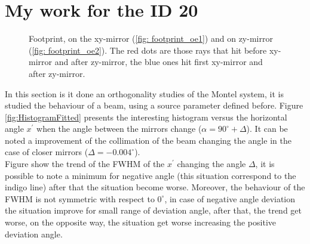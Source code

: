 \section{My work for the ID 20}

\begin{figure}[]
%
\centering
%
%
\quad
%
\caption{Footprint, on the xy-mirror (\ref{fig: footprint_oe1}) and on zy-mirror (\ref{fig: footprint_oe2}). The red dots are those rays that hit before xy-mirror and after zy-mirror, the blue ones hit first xy-mirror and after zy-mirror.}
%
\label{fig: footprint}
%
\end{figure}
In this section is it done an orthogonality studies of the Montel system, it is studied the behaviour of a beam, using a source parameter defined before. Figure \ref{fig:HistogramFitted} presents the interesting histogram versus the horizontal angle $x^{'} $ when the angle between the mirrors change ($\alpha = 90^{\circ} + \Delta $). It can be noted a improvement of the collimation of the beam changing the angle in the case of closer mirrors ($\Delta = -0.004^{\circ} $).
\\
Figure show the trend of the FWHM of the $x^{'} $ changing the angle $\Delta $, it is possible to note a minimum for negative angle (this  situation correspond to the indigo line) after that the situation become worse. Moreover, the behaviour of the FWHM is not symmetric with respect to $0^{\circ} $, in case of negative angle deviation the situation improve for small range of deviation angle, after that, the trend get worse, on the opposite way, the situation get worse increasing the positive deviation angle. 
